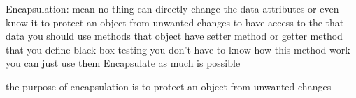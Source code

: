 
Encapsulation:
  mean no thing can directly change the data attributes or even know it 
  to protect an object from unwanted changes 
  to have access to the that data you should use methods that object have  
  setter method or getter method that you define 
  black box testing 
  you don't have to know how this method work you can just use them 
  Encapsulate as much is possible

   the purpose of encapsulation
    is to protect an object from unwanted changes